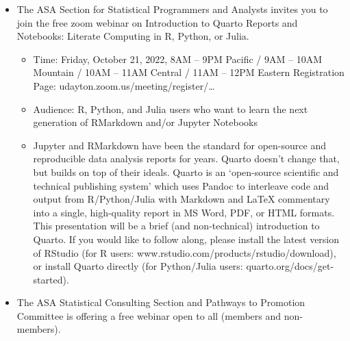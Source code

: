 \documentclass[
  letterpaper,
  DIV=11,
  numbers=noendperiod,
  oneside]{scrartcl}
\providecommand{\tightlist}{%
  \setlength{\itemsep}{0pt}\setlength{\parskip}{0pt}}\usepackage{longtable,booktabs,array}
\begin{document}
\begin{itemize}
\tightlist
\item
  The ASA Section for Statistical Programmers and Analysts invites you
  to join the free zoom webinar on Introduction to Quarto Reports and
  Notebooks: Literate Computing in R, Python, or Julia.

  \begin{itemize}
  \tightlist
  \item
    Time: Friday, October 21, 2022, 8AM -- 9PM Pacific / 9AM -- 10AM
    Mountain / 10AM -- 11AM Central / 11AM -- 12PM Eastern Registration
    Page: udayton.zoom.us/meeting/register/\ldots{}
  \item
    Audience: R, Python, and Julia users who want to learn the next
    generation of RMarkdown and/or Jupyter Notebooks
  \item
    Jupyter and RMarkdown have been the standard for open-source and
    reproducible data analysis reports for years. Quarto doesn't change
    that, but builds on top of their ideals. Quarto is an `open-source
    scientific and technical publishing system' which uses Pandoc to
    interleave code and output from R/Python/Julia with Markdown and
    LaTeX commentary into a single, high-quality report in MS Word, PDF,
    or HTML formats. This presentation will be a brief (and
    non-technical) introduction to Quarto. If you would like to follow
    along, please install the latest version of RStudio (for R users:
    www.rstudio.com/products/rstudio/download), or install Quarto
    directly (for Python/Julia users: quarto.org/docs/get-started).
  \end{itemize}
\item
  The ASA Statistical Consulting Section and Pathways to Promotion
  Committee is offering a free webinar open to all (members and
  non-members).


\end{itemize}
\end{document}
